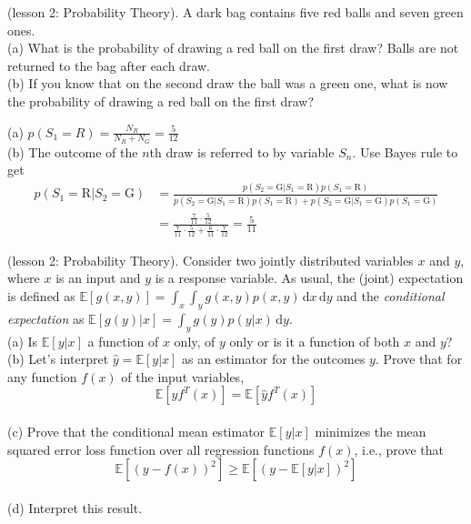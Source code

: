 \documentclass[a4paper]{article}
\newcommand{\Exp}{\mathbb{E}}
\def\d#1{{\,\mathrm{d}#1}}
\begin{document}
\begin{ExerciseList}
 \Exercise[label={ex:causality}] (lesson 2: Probability Theory).  A dark bag contains five red balls and seven green ones. \\(a) What is the probability of drawing a red ball on the first draw? Balls are not returned to the bag after each draw. \\(b) If you know that on the second draw the ball was a green one, what is now the probability of drawing a red ball on the first draw?

\Answer[ref={ex:causality}]
(a) $p(S_1=R) = \frac{N_R}{N_R+N_G}= \frac{5}{12}$ \\
(b) The outcome of the $n$th draw is referred to by variable $S_n$. Use Bayes rule to get 
\begin{align*}
p(S_1=\text{R}|S_2=\text{G}) &=\frac{p(S_2=\text{G}|S_1=\text{R})p(S_1=\text{R})}{p(S_2=\text{G}|S_1=\text{R})p(S_1=\text{R})+p(S_2=\text{G}|S_1=\text{G})p(S_1=\text{G})}\\
&= \frac{\frac{7}{11}\cdot\frac{5}{12}}{\frac{7}{11}\cdot\frac{5}{12}+\frac{6}{11}\cdot\frac{7}{12}} = \frac{5}{11}
\end{align*}


\Exercise[label={ex:conditional-mean}] (lesson 2: Probability Theory).  Consider two jointly distributed variables $x$ and $y$, where $x$ is an input and $y$ is a response variable. As usual, the (joint) expectation is defined as $\Exp[g(x,y)] = \int_x\int_y g(x,y) p(x,y)\d{x}\d{y}$ and the \emph{conditional expectation} as $\Exp[g(y)|x] = \int_y g(y) p(y|x)\d{y}$. \\
(a) Is $\Exp[y|x]$ a function of $x$ only, of $y$ only or is it a function of both $x$ and $y$?\\
(b) Let's interpret $\hat y=\Exp[y|x]$ as an estimator for the outcomes $y$.  Prove that for any function $f(x)$ of the input variables,
$$
\Exp[yf^T(x)] = \Exp[\hat y f^T(x)]
$$
\\
(c) Prove that the conditional mean estimator $\Exp[y|x]$ minimizes the mean squared error loss function over all regression functions $f(x)$, i.e., prove that
$$
\Exp\left[(y-f(x))^2\right] \geq \Exp\left[ (y-\Exp[y|x])^2\right]
$$
\\
(d) Interpret this result.


\end{ExerciseList}
\end{document}
